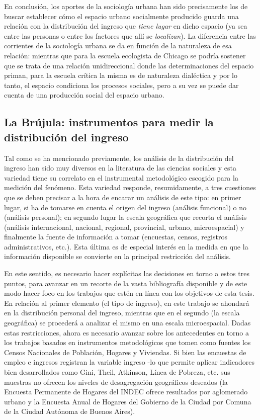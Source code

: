 En conclusión, los aportes de la sociología urbana han sido precisamente los de buscar establecer cómo el espacio urbano socialmente producido guarda una relación con la distribución del ingreso que \textit{tiene lugar} en dicho espacio (ya sea entre las personas o entre los factores que allí se \textit{localizan}). La diferencia entre las corrientes de la sociología urbana se da en función de la naturaleza de esa relación: mientras que para la escuela ecologista de Chicago \cite{park,burgess1928,mckenzie,wirth} se podría sostener que se trata de una relación unidireccional donde las determinaciones del espacio priman, para la escuela crítica \cite{lefebvre,castells,harvey} la misma es de naturaleza dialéctica y por lo tanto, el espacio condiciona los procesos sociales, pero a su vez se puede dar cuenta de una producción social del espacio urbano.

\subsection{La Brújula: instrumentos para medir la distribución del ingreso}
	
Tal como se ha mencionado previamente, los análisis de la distribución del ingreso han sido muy diversos en la literatura de las ciencias sociales y esta variedad tiene su correlato en el instrumental metodológico escogido para la medición del fenómeno. Esta variedad responde, resumidamente, a tres cuestiones que se deben precisar a la hora de encarar un análisis de este tipo: en primer lugar, si ha de tomarse en cuenta el origen del ingreso (análisis funcional) o no (análisis personal); en segundo lugar la escala geográfica que recorta el análisis (análisis internacional, nacional, regional, provincial, urbano, microespacial) y finalmente la fuente de información a tomar (encuestas, censos, registros administrativos, etc.). Esta última es de especial interés en la medida en que la información disponible se convierte en la principal restricción del análisis. 

En este sentido, es necesario hacer explícitas las decisiones en torno a estos tres puntos, para avanzar en un recorte de la vasta bibliografía disponible y de este modo hacer foco en los trabajos que estén en línea con los objetivos de esta tesis. En relación al primer elemento (el tipo de ingreso), en este trabajo se ahondará en la distribución personal del ingreso, mientras que en el segundo (la escala geográfica) se procederá a analizar el mismo en una escala microespacial. Dadas estas restricciones, ahora es necesario avanzar sobre los antecedentes en torno a los trabajos basados en instrumentos metodológicos que tomen como fuentes los Censos Nacionales de Población, Hogares y Viviendas. Si bien las encuestas de empleo e ingresos registran la variable ingreso -lo que permite aplicar indicadores bien desarrollados como Gini, Theil, Atkinson, Línea de Pobreza, etc. \cite{worldbank,beccaria,altimir2002} sus muestras no ofrecen los niveles de desagregación geográficos deseados (la Encuesta Permanente de Hogares del INDEC ofrece resultados por aglomerado urbano y la Encuesta Anual de Hogares del Gobierno de la Ciudad por Comuna de la Ciudad Autónoma de Buenos Aires). 

